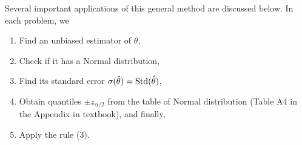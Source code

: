 \noindent Several important applications of this general method are discussed below. In each problem, we
\begin{enumerate}
  \item Find an unbiased estimator of $\theta$,
  \item Check if it has a Normal distribution,
  \item Find its standard error $\sigma(\hat{\theta}) = \textnormal{Std}(\hat{\theta})$,
  \item Obtain quantiles $\pm z_{\alpha/2}$ from the table of Normal distribution (Table A4 in the Appendix in textbook), and finally,
  \item Apply the rule (3).
\end{enumerate}